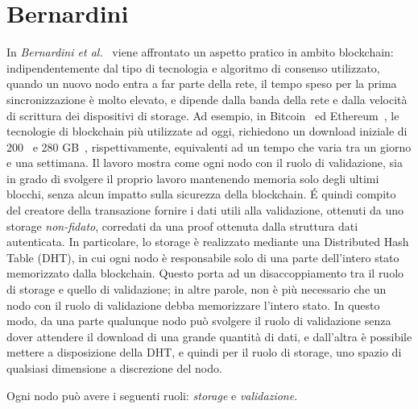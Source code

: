 \section{Bernardini}
In \emph{Bernardini et al.}~\cite{bernardini2019blockchains} viene affrontato un aspetto pratico in ambito blockchain: indipendentemente dal tipo di tecnologia e algoritmo di consenso utilizzato, quando un nuovo nodo entra a far parte della rete, il tempo speso per la prima sincronizzazione è molto elevato, e dipende dalla banda della rete e dalla velocità di scrittura dei dispositivi di storage. Ad esempio, in Bitcoin~\cite{nakamoto2019bitcoin} ed Ethereum~\cite{wood2014ethereum}, le tecnologie di blockchain più utilizzate ad oggi, richiedono un download iniziale di 200~\cite{bitcoin2020fullnode} e 280 GB~\cite{ethereum2020chart}, rispettivamente, equivalenti ad un tempo che varia tra un giorno e una settimana.
Il lavoro mostra come ogni nodo con il ruolo di validazione, sia in grado di svolgere il proprio lavoro mantenendo memoria solo degli ultimi blocchi, senza alcun impatto sulla sicurezza della blockchain. \'E quindi compito del creatore della transazione fornire i dati utili alla validazione, ottenuti da uno storage \emph{non-fidato}, corredati da una proof ottenuta dalla struttura dati autenticata. In particolare, lo storage è realizzato mediante una Distributed Hash Table (DHT), in cui ogni nodo è responsabile solo di una parte dell'intero stato memorizzato dalla blockchain. Questo porta ad un disaccoppiamento tra il ruolo di storage e quello di validazione; in altre parole, non è più necessario che un nodo con il ruolo di validazione debba memorizzare l'intero stato. In questo modo, da una parte qualunque nodo può svolgere il ruolo di validazione senza dover attendere il download di una grande quantità di dati, e dall'altra è possibile mettere a disposizione della DHT, e quindi per il ruolo di storage, uno spazio di qualsiasi dimensione a discrezione del nodo.

Ogni nodo può avere i seguenti ruoli: \emph{storage} e \emph{validazione}.

